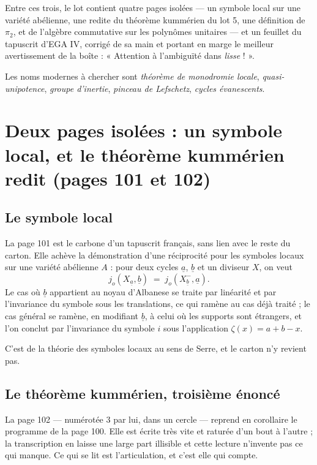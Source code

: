 \documentclass[11pt,a4paper]{article}
\begin{document}
\begin{resume}
Entre ces trois, le lot contient quatre pages isolées --- un symbole local sur
une variété abélienne, une redite du théorème kummérien du lot 5, une
définition de $\pi_{2}$, et de l'algèbre commutative sur les polynômes unitaires
--- et un feuillet du tapuscrit d'EGA IV, corrigé de sa main et portant en
marge le meilleur avertissement de la boîte : « Attention à l'ambiguïté dans
\emph{lisse} ! ».

Les noms modernes à chercher sont \emph{théorème de monodromie locale},
\emph{quasi-unipotence}, \emph{groupe d'inertie}, \emph{pinceau de Lefschetz},
\emph{cycles évanescents}.

\end{resume}

\section*{Deux pages isolées : un symbole local, et le théorème kummérien redit (pages 101 et 102)}

\subsection*{Le symbole local}

La page 101 est le carbone d'un tapuscrit français, sans lien avec le reste du
carton. Elle achève la démonstration d'une réciprocité pour les symboles locaux
sur une variété abélienne $A$ : pour deux cycles $\underline{a}$,
$\underline{b}$ et un diviseur $X$, on veut
\[
  j_{o}(X_{\underline{a}}, \underline{b}) \;=\;
  j_{o}(X^{-}_{\underline{b}}, \underline{a}) .
\]
Le cas où $\underline{b}$ appartient au noyau d'Albanese se traite par
linéarité et par l'invariance du symbole sous les translations, ce qui ramène
au cas déjà traité ; le cas général se ramène, en modifiant $\underline{b}$, à
celui où les supports sont étrangers, et l'on conclut par l'invariance du
symbole $i$ sous l'application $\zeta(x) = a + b - x$.

C'est de la théorie des symboles locaux au sens de Serre, et le carton n'y
revient pas.

\subsection*{Le théorème kummérien, troisième énoncé}

La page 102 --- numérotée 3 par lui, dans un cercle --- reprend en corollaire le
programme de la page 100. Elle est écrite très vite et raturée d'un bout à
l'autre ; la transcription en laisse une large part illisible et cette lecture
n'invente pas ce qui manque. Ce qui se lit est l'articulation, et c'est elle
qui compte.
\end{document}
